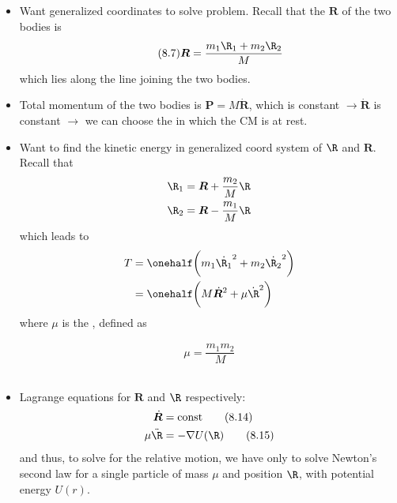 \documentclass[10pt, twocolumn]{article}
\DeclareRobustCommand{\mybox}[2][gray!20]{%
	\begin{tcolorbox}[   %
		breakable,
		left=0pt,
		right=0pt,
		top=-13pt,
		bottom=0pt,
		colback=#1,
		colframe=#1,
		width=0.45\dimexpr\textwidth\relax,
		enlarge left by=0mm,
		boxsep=1pt,
		arc=0pt,outer arc=0pt,
		]
		#2
	\end{tcolorbox}
}
\begin{document}
\subsection{}
\begin{itemize}
	\item Want generalized coordinates to solve problem. Recall that the  $\bm{R}$ of the two bodies is
	\begin{align}\tag{8.7}
		\bm{R} = \dfrac{m_1 \R_1 + m_2 \R_2}{M}
		\label{8.7}
	\end{align}
	which lies along the line joining the two bodies. 
	\item Total momentum of the two bodies is $\bm{P} = M \dot{\bm{R}}$, which is constant $\rightarrow \dot{\bm{R}}$ is constant $\rightarrow$ we can choose the  in which the CM is at rest. 
	\item Want to find the kinetic energy in generalized coord system of $\R$ and $\bm{R}$. Recall that 
	\begin{align}
		\R_1 &= \bm{R} + \frac{m_2}{M}\R \\
		\R_2 &= \bm{R} - \frac{m_1}{M}\R 
	\end{align}
	which leads to 
	\begin{align}
		T &= \onehalf \bigg( m_1 \dot{\R_1}^2 + m_2 \dot{\R_2}^2 \bigg) \\
		&= \onehalf \bigg( M\dot{\bm{R}}^2 + \mu \dot{\R}^2 \bigg) 
	\end{align}
	where $\mu$ is the , defined as \mybox[gray!20]{
		\begin{align} \tag{8.11}
			\mu = \dfrac{m_1 m_2}{M}
		\label{8.11}
		\end{align}}
\end{itemize}

\newpage
\subsection{}
\begin{itemize}
	\item Lagrange equations for $\bm{R}$ and $\R$ respectively:
	\begin{align} 
		\dot{\bm{R}} &= \text{const}  	\tag{8.14}\label{8.14} \\
		\mu \ddot{\R} &= - \nabla U(\R) \tag{8.15}\label{8.15}
	\end{align}
	and thus, to solve for the relative motion, we have only to solve Newton's second law for a single particle of mass $\mu$ and position $\R$, with potential energy $U(r)$. 
\end{itemize}
\end{document}
